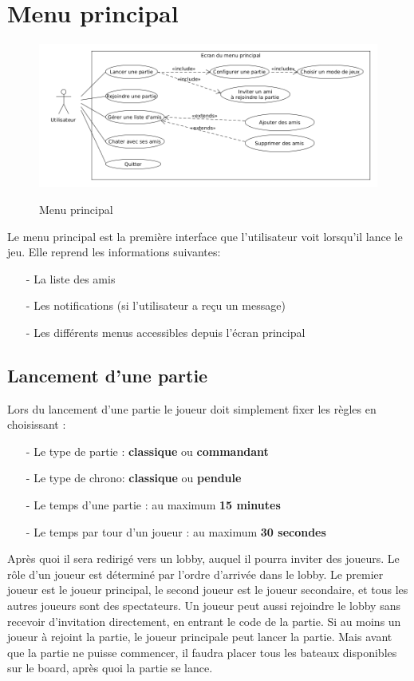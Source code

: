 \documentclass[../besoin_user.tex]{subfiles}
\begin{document}
\section{Menu principal}
\begin{figure}[h]
    \centering
    \includegraphics[scale=0.5]{img_fonctionnel/use_case_user_ecran_principal.png}
    \label{fig:user_menu_principal}
    \caption{Menu principal}
\end{figure}

Le menu principal est la première interface que l'utilisateur voit lorsqu'il lance le jeu.
Elle reprend les informations suivantes:
\begin{itemize}
    \item[-] La liste des amis
    \item[-] Les notifications (si l'utilisateur a reçu un message)
    \item[-] Les différents menus accessibles depuis l'écran principal 
\end{itemize}

\subsection{Lancement d'une partie}
Lors du lancement d'une partie le joueur doit simplement fixer les règles en choisissant :
\begin{itemize}
	\item[-] Le type de partie : \textbf{classique} ou \textbf{commandant}
    \item[-] Le type de chrono: \textbf{classique} ou \textbf{pendule}
	\item[-] Le temps d'une partie : au maximum \textbf{15 minutes}
	\item[-] Le temps par tour d'un joueur : au maximum \textbf{30 secondes}
\end{itemize}

Après quoi il sera redirigé vers un lobby, auquel il pourra inviter des joueurs. Le rôle d'un joueur est déterminé par l'ordre d'arrivée dans le lobby. 
Le premier joueur est le joueur principal, le second joueur est le joueur secondaire, et tous les autres joueurs sont des spectateurs.
Un joueur peut aussi rejoindre le lobby sans recevoir d'invitation directement, en entrant le code de la partie.
Si au moins un joueur à rejoint la partie, le joueur principale peut lancer la partie.
Mais avant que la partie ne puisse commencer, il faudra placer tous les bateaux disponibles sur le board, après quoi la partie se lance.
\end{document}
